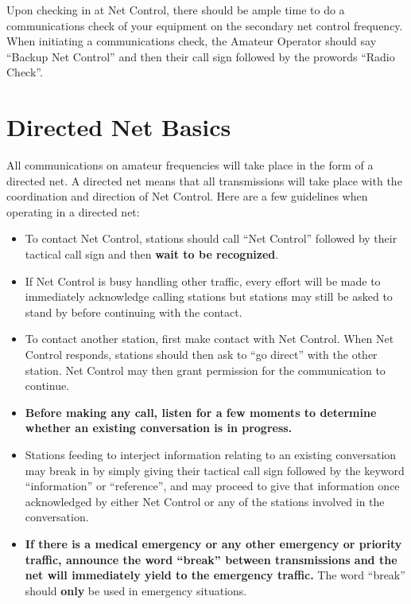 \documentclass[pdflatex,letterpaper,twoside,12pt]{book}
\begin{document}
Upon checking in at Net Control, there should be ample time to do a communications check of your equipment on the secondary net control frequency.  When initiating a communications check, the Amateur Operator should say “Backup Net Control” and then their call sign followed by the prowords “Radio Check”.


\section{Directed Net Basics}

All communications on amateur frequencies will take place in the form of a directed net.  A directed net means that all transmissions will take place with the coordination and direction of Net Control.  Here are a few guidelines when operating in a directed net:

\begin{itemize}

	\item To contact Net Control, stations should call ``Net Control'' followed by their tactical call sign and then \textbf{wait to be recognized}.
	\item If Net Control is busy handling other traffic, every effort will be made to immediately acknowledge calling stations but stations may still be asked to stand by before continuing with the contact.
	\item To contact another station, first make contact with Net Control.  When Net Control responds, stations should then ask to ``go direct'' with the other station.  Net Control may then grant permission for the communication to continue.
	\item \textbf{Before making any call, listen for a few moments to determine whether an existing conversation is in progress.}
	\item Stations feeding to interject information relating to an existing conversation may break in by simply giving their tactical call sign followed by the keyword ``information'' or ``reference'', and may proceed to give that information once acknowledged by either Net Control or any of the stations involved in the conversation.
	\item \textbf{If there is a medical emergency or any other emergency or priority traffic, announce the word ``break'' between transmissions and the net will immediately yield to the emergency traffic.}  The word ``break'' should \textbf{only} be used in emergency situations.

\end{itemize}
\end{document}
